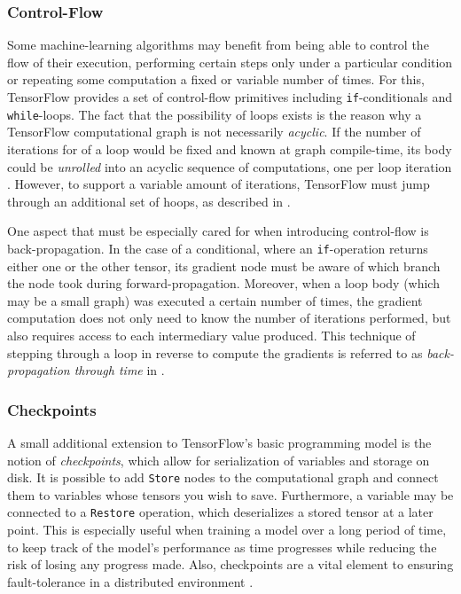 \subsubsection{Control-Flow}\label{sec:model-ext-flow}

Some machine-learning algorithms may benefit from being able to control the flow
of their execution, performing certain steps only under a particular condition
or repeating some computation a fixed or variable number of times. For this,
TensorFlow provides a set of control-flow primitives including
\texttt{if}-conditionals and \texttt{while}-loops. The fact that the possibility
of loops exists is the reason why a TensorFlow computational graph is not
necessarily \emph{acyclic}. If the number of iterations for of a loop would be
fixed and known at graph compile-time, its body could be \emph{unrolled} into an
acyclic sequence of computations, one per loop iteration \cite{theano}. However,
to support a variable amount of iterations, TensorFlow must jump through an
additional set of hoops, as described in \cite{tensorflow}.

One aspect that must be especially cared for when introducing control-flow is
back-propagation. In the case of a conditional, where an \texttt{if}-operation
returns either one or the other tensor, its gradient node must be aware of which
branch the node took during forward-propagation. Moreover, when a loop body
(which may be a small graph) was executed a certain number of times, the
gradient computation does not only need to know the number of iterations
performed, but also requires access to each intermediary value produced. This
technique of stepping through a loop in reverse to compute the gradients is
referred to as \emph{back-propagation through time} in \cite{theano}.

\subsubsection{Checkpoints}\label{sec:model-ext-check}

A small additional extension to TensorFlow's basic programming model is the
notion of \emph{checkpoints}, which allow for serialization of variables and
storage on disk. It is possible to add \texttt{Store} nodes to the computational
graph and connect them to variables whose tensors you wish to save. Furthermore,
a variable may be connected to a \texttt{Restore} operation, which deserializes
a stored tensor at a later point. This is especially useful when training a
model over a long period of time, to keep track of the model's performance as
time progresses while reducing the risk of losing any progress made. Also,
checkpoints are a vital element to ensuring fault-tolerance in a distributed
environment \cite{tensorflow}.

